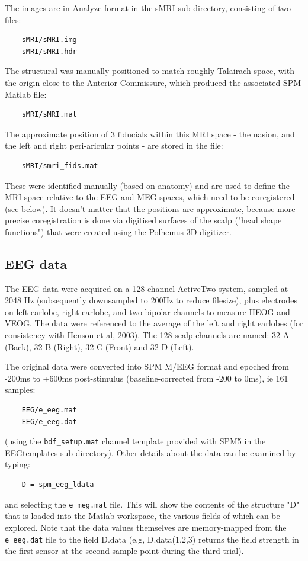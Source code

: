 The images are in Analyze format in the sMRI sub-directory, consisting of two files:
\begin{verbatim}
    sMRI/sMRI.img
    sMRI/sMRI.hdr
\end{verbatim}
The structural was manually-positioned to match roughly Talairach space, with the origin close to the Anterior Commissure, which produced the associated SPM Matlab file:
\begin{verbatim}
    sMRI/sMRI.mat
\end{verbatim}
The approximate position of 3 fiducials within this MRI space - the nasion, and the left and right peri-aricular points - are stored in the file:
\begin{verbatim}
    sMRI/smri_fids.mat
\end{verbatim}
These were identified manually (based on anatomy) and are used to define the MRI space relative to the EEG and MEG spaces, which need to be coregistered (see below). It doesn't matter that the positions are approximate, because more precise coregistration is done via digitised surfaces of the scalp ("head shape functions") that were created using the Polhemus 3D digitizer.

\subsection{EEG data}

The EEG data were acquired on a 128-channel ActiveTwo system, sampled at 2048 Hz (subsequently downsampled to 200Hz to reduce filesize), plus electrodes on left earlobe, right earlobe, and two bipolar channels to measure HEOG and VEOG. The data were referenced to the average of the left and right earlobes (for consistency with Henson et al, 2003). The 128 scalp channels are named: 32 A (Back), 32 B (Right), 32 C (Front) and 32 D (Left).

The original data were converted into SPM M/EEG format and epoched from -200ms to +600ms post-stimulus (baseline-corrected from -200 to 0ms), ie 161 samples:
\begin{verbatim}
    EEG/e_eeg.mat
    EEG/e_eeg.dat
\end{verbatim}
(using the \verb!bdf_setup.mat! channel template provided with SPM5 in the EEGtemplates sub-directory).
Other details about the data can be examined by typing:
\begin{verbatim}
    D = spm_eeg_ldata
\end{verbatim}
and selecting the \verb!e_meg.mat! file. This will show the contents of the structure "D" that is loaded into the Matlab workspace, the various fields of which can be explored. Note that the data values themselves are memory-mapped from the \verb!e_eeg.dat! file to the field D.data (e.g, D.data(1,2,3) returns the field strength in the first sensor at the second sample point during the third trial).

